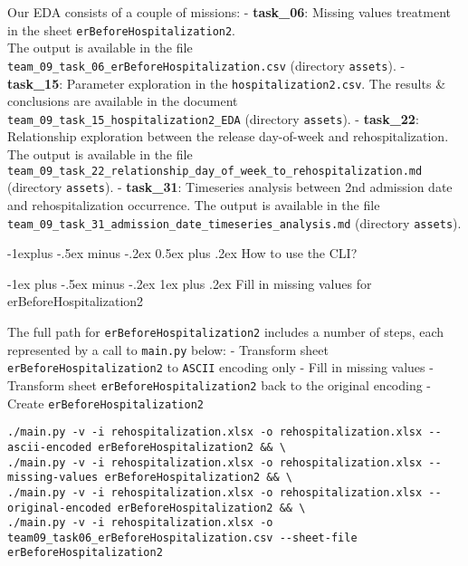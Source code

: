 \documentclass[a4paper,landscape]{article}
\makeatletter
\renewcommand{\subsection}{\@startsection{subsection}{2}{0mm}%
                                {-1explus -.5ex minus -.2ex}%
                                {0.5ex plus .2ex}%
                                {\normalfont\normalsize\bfseries}}
\renewcommand{\subsubsection}{\@startsection{subsubsection}{3}{0mm}%
                                {-1ex plus -.5ex minus -.2ex}%
                                {1ex plus .2ex}%
                                {\normalfont\small\bfseries}}
\makeatother
\begin{document}
Our EDA consists of a couple of missions: - \textbf{task\_06}: Missing
values treatment in the sheet \texttt{erBeforeHospitalization2}.\\
The output is available in the file
\texttt{team\_09\_task\_06\_erBeforeHospitalization.csv} (directory
\texttt{assets}). - \textbf{task\_15}: Parameter exploration in the
\texttt{hospitalization2.csv}. The results \& conclusions are available
in the document \texttt{team\_09\_task\_15\_hospitalization2\_EDA}
(directory \texttt{assets}). - \textbf{task\_22}: Relationship
exploration between the release day-of-week and rehospitalization. The
output is available in the file
\texttt{team\_09\_task\_22\_relationship\_day\_of\_week\_to\_rehospitalization.md}
(directory \texttt{assets}). - \textbf{task\_31}: Timeseries analysis
between 2nd admission date and rehospitalization occurrence. The output
is available in the file
\texttt{team\_09\_task\_31\_admission\_date\_timeseries\_analysis.md}
(directory \texttt{assets}).

\subsection{How to use the CLI?}\label{how-to-use-the-cli}

\subsubsection{Fill in missing values for
erBeforeHospitalization2}\label{fill-in-missing-values-for-erbeforehospitalization2}

The full path for \texttt{erBeforeHospitalization2} includes a number of
steps, each represented by a call to \texttt{main.py} below: - Transform
sheet \texttt{erBeforeHospitalization2} to \texttt{ASCII} encoding only
- Fill in missing values - Transform sheet
\texttt{erBeforeHospitalization2} back to the original encoding - Create
\texttt{erBeforeHospitalization2}

\begin{verbatim}
./main.py -v -i rehospitalization.xlsx -o rehospitalization.xlsx --ascii-encoded erBeforeHospitalization2 && \
./main.py -v -i rehospitalization.xlsx -o rehospitalization.xlsx --missing-values erBeforeHospitalization2 && \
./main.py -v -i rehospitalization.xlsx -o rehospitalization.xlsx --original-encoded erBeforeHospitalization2 && \
./main.py -v -i rehospitalization.xlsx -o team09_task06_erBeforeHospitalization.csv --sheet-file erBeforeHospitalization2
\end{verbatim}
\end{document}
